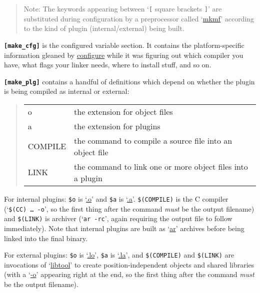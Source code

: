 \documentclass{article}
\newcommand{\cmd}{\url}
\newcommand{\cmd}{\texttt}
\newenvironment{note}{\begin{quote}\color{red} Note: }{\end{quote}}
\begin{document}
\begin{note}
The keywords
appearing between `\texttt{[} square brackets \texttt{]}'
are substituted during configuration by a preprocessor called
`\cmd{mkmf}'
according to the kind of plugin (internal/external) being built.
\end{note}

\texttt{\textbf{[make\_cfg]}}
is the configured variable section.  It
contains the platform-specific information gleaned by \cmd{configure}
while it was figuring out which compiler you have, what flags your
linker needs, where to install stuff, and so on.

\texttt{\textbf{[make\_plg]}}
contains a handful of definitions which
depend on whether the plugin is being compiled as internal or
external:
\begin{quote}\begin{tabular}{@{\ttfamily}l@{~~~}l}
o       & the extension for object files \\
a       & the extension for plugins \\
COMPILE & the command to compile a source file into an object file \\
LINK    & the command to link one or more object files into a plugin \\
\end{tabular}\end{quote}

For internal plugins: \texttt{\$o} is `\cmd{.o}' and \texttt{\$a} is
`\cmd{.a}'.  \texttt{\$(COMPILE)} is the C compiler
(`\texttt{\$(CC)~\ldots~-o}', so the first thing after the command
\emph{must} be the output filename) and \texttt{\$(LINK)} is archiver
(`\texttt{ar -rc}', again requiring the output file to follow
immediately).  Note that internal plugins are built as `\cmd{ar}'
archives before being linked into the final binary.

For external plugins: \texttt{\$o} is `\cmd{.lo}', \texttt{\$a} is
`\cmd{.la}', and \texttt{\$(COMPILE)} and \texttt{\$(LINK)} are
invocations of `\cmd{libtool}' to create position-independent objects and
shared libraries (with a `\cmd{-o}' appearing right at the end, so the
first thing after the command \emph{must} be the output filename).
\end{document}
